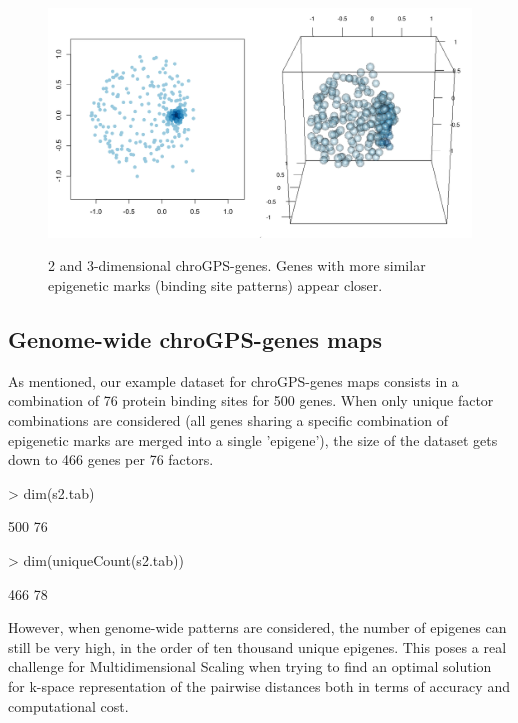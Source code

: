 \documentclass[a4paper,12pt,nogin]{article}
\newcommand{\newtext}[1]{{\color{blue} #1}} %
\begin{document}
\begin{figure}
\begin{center}
{\includegraphics{mds-2d-3d.png}}
\end{center}
\caption{2 and 3-dimensional chroGPS-genes. Genes with more similar
  epigenetic marks (binding site patterns) appear closer.}
\label{fig:mds6}
\end{figure}
 
\subsection{Genome-wide chroGPS-genes maps}
\label{sec:splitMDS}
 
As mentioned, our example dataset for chroGPS-genes maps consists in a combination
of 76 protein binding sites for 500 genes. When only unique factor
combinations are considered (all genes sharing a specific combination
of epigenetic marks are merged into a single 'epigene'), the size of
the dataset gets down to 466 genes per 76 factors.
 
\footnotesize
 
\begin{Schunk}
\begin{Sinput}
> dim(s2.tab)
\end{Sinput}
\begin{Soutput}
[1] 500  76
\end{Soutput}
\begin{Sinput}
> dim(uniqueCount(s2.tab))
\end{Sinput}
\begin{Soutput}
[1] 466  78
\end{Soutput}
\end{Schunk}
 
\normalsize
 
However, when genome-wide patterns are considered, the number of epigenes can still be very high, in the order of ten
thousand unique epigenes. This poses a real challenge for
Multidimensional Scaling when trying to find an
optimal solution for k-space representation of the pairwise distances
\newtext{both in terms of accuracy and computational cost.}
\end{document}
